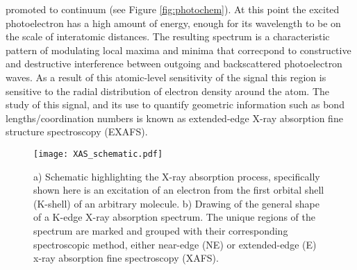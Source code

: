 \documentclass{article}
\begin{document}
promoted to continuum (see Figure \ref{fig:photochem}). At this point the excited photoelectron has a high amount of energy, enough for its wavelength to be on the scale of interatomic distances. The resulting spectrum is a characteristic pattern of modulating local maxima and minima that correcpond to constructive and destructive interference between outgoing and backscattered photoelectron waves. As a result of this atomic-level sensitivity of the signal this region is sensitive to the radial distribution of electron density around the atom. The study of this signal, and its use to quantify geometric information such as bond lengths/coordination numbers is known as extended-edge X-ray absorption fine structure spectroscopy (EXAFS). \cite{lengeler_extended_1980,teo_exafs:_2012,gurman_rapid_1984,bunker_application_1983}

\begin{figure}
\centering
\texttt{[image: XAS\_schematic.pdf]}
\caption{a) Schematic highlighting the X-ray absorption process, specifically shown here is an excitation of an electron from the first orbital shell (K-shell) of an arbitrary molecule. b) Drawing of the general shape of a K-edge X-ray absorption spectrum. The unique regions of the spectrum are marked and grouped with their corresponding spectroscopic method, either near-edge (NE) or extended-edge (E) x-ray absorption fine spectroscopy (XAFS).}
\label{fig:xas_schematic}
\end{figure}
\end{document}
